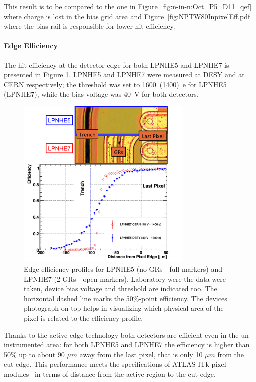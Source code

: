 This result is to be compared to the one in Figure~\ref{fig:n-in-n:Oct_P5_D11_qef} where charge is lost 
in the bias grid area and Figure~\ref{fig:NPTW80InpixelEff.pdf} where the bias rail is responsible for 
lower hit efficiency.

\paragraph{Edge Efficiency}
The hit efficiency at the detector edge for both LPNHE5 and LPNHE7 is presented in Figure \ref{fig:edge_comparison}. LPNHE5 and LPNHE7 were measured at DESY and at CERN respectively; the threshold was set to 1600~(1400)~e for LPNHE5 (LPNHE7), while the bias voltage was 40~V for both detectors.
\begin{figure}[!htbp]
\centering 
\includegraphics[width=0.75\textwidth,origin=c,angle=0]{edgeeff_full_range_pics.png}
\caption{\label{fig:edge_comparison}
Edge efficiency profiles for  LPNHE5 (no GRs - full markers) and LPNHE7 (2 GRs - open markers). Laboratory were the data were taken, device bias voltage and threshold are indicated too. The horizontal dashed line marks the
50\%-point efficiency. The devices photograph on top helps in visualizing which physical area of the pixel is related to the efficiency profile.}
\end{figure}

Thanks to the active edge technology both detectors are efficient even in the un-instrumented area: for both LPNHE5 and LPNHE7 the efficiency is higher than 50$\%$ up to about 90 $\mu m$ away from the last pixel, that is only 10 $\mu m$ from the cut edge. This performance meets the specifications of ATLAS ITk pixel modules~\cite{ITkStripsTDR} in terms of distance from the active region to the cut edge.

